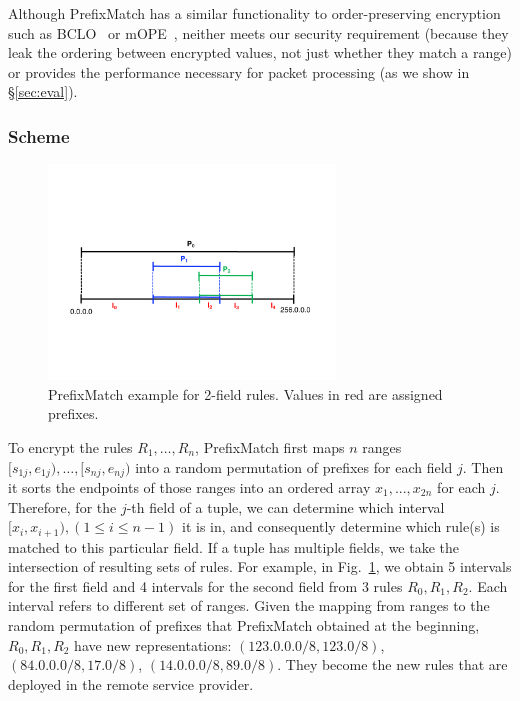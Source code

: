Although PrefixMatch has a similar functionality to order-preserving encryption such as BCLO~\cite{boldyreva:ope} or mOPE~\cite{popa:mope}, neither meets our security requirement (because they leak the ordering between encrypted values, not just whether they match a range) or provides the performance necessary for packet processing (as we show in \S\ref{sec:eval}).

\subsubsection{Scheme} 
\label{sec:rmscheme}

\begin{figure}[t]
  \centering
  \includegraphics[width=3in]{fig/rangeopts3.pdf}
  \caption[]{PrefixMatch example for 2-field rules. Values in red are assigned prefixes. \label{fig:rangeopts3}}
\end{figure}

To encrypt the rules $R_1, \dots, R_n$, PrefixMatch first maps $n$ ranges $[s_{1j}, e_{1j}), \dots, [s_{nj}, e_{nj})$ into a random permutation of prefixes for each field $j$. Then it sorts the endpoints of those ranges into an ordered array $x_1, ..., x_{2n}$ for each $j$. Therefore, for the $j$-th field of a tuple, we can determine which interval $[x_i, x_{i+1}), (1 \leq i \leq n-1)$ it is in, and consequently determine which rule(s) is matched to this particular field. If a tuple has multiple fields, we take the intersection of resulting sets of rules. For example, in Fig.~\ref{fig:rangeopts3}, we obtain 5 intervals for the first field and 4 intervals for the second field from 3 rules $R_0, R_1, R_2$. Each interval refers to different set of ranges. Given the mapping from ranges to the random permutation of prefixes that PrefixMatch obtained at the beginning, $R_0, R_1, R_2$ have new representations: $(123.0.0.0/8, 123.0/8)$, $(84.0.0.0/8, 17.0/8)$, $(14.0.0.0/8, 89.0/8)$. They become the new rules that are deployed in the remote service provider.


